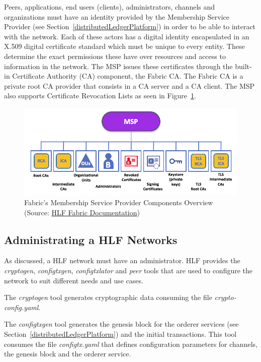 Peers, applications, end users (clients), administrators, channels and
organizations must have an identity provided by the Membership Service Provider
(see Section~\ref{distributedLedgerPlatform}) in order to be able to interact
with the network. Each of these actors has a digital identity encapsulated in
an X.509 digital certificate standard which must be unique to every entity.
These determine the exact permissions these have over resources and access to
information in the network. The MSP issues these certificates through the
built-in Certificate Authority (CA) component, the Fabric CA. The Fabric CA is
a private root CA provider that consists in a CA server and a CA client. The
MSP also supports Certificate Revocation Lists as seen in
Figure~\ref{fig:membershipFabric}.

\begin{figure}[ht] 
  \centering
  \includegraphics[width=0.9\linewidth]{imgs/membershipFabric.png}
  \caption{\label{fig:membershipFabric}Fabric's Membership Service Provider
  Components Overview (Source:
  \href{https://hyperledger-fabric.readthedocs.io/en/release-1.2/ledger/ledger.html}{HLF
  Fabric Documentation})}
\end{figure}

\subsection{Administrating a HLF Networks}

As discussed, a HLF network must have an administrator. HLF provides the
\textit{cryptogen}, \textit{configtxgen}, \textit{configtxlator} and
\textit{peer} tools that are used to configure the network to suit different
needs and use cases.

The \textit{cryptogen} tool generates cryptographic data consuming the file
\textit{crypto-config.yaml}.

The \textit{configtxgen} tool generates the genesis block for the orderer
services (see Section~\ref{distributedLedgerPlatform}) and the initial
transactions.  This tool consumes the file \textit{configtx.yaml} that defines
configuration parameters for channels, the genesis block and the orderer
service.

